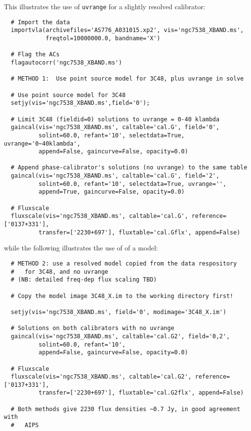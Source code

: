 This illustrates the use of {\tt uvrange} for a slightly resolved 
calibrator:
\small
\begin{verbatim}
  # Import the data
  importvla(archivefiles='AS776_A031015.xp2', vis='ngc7538_XBAND.ms',
            freqtol=10000000.0, bandname='X')

  # Flag the ACs
  flagautocorr('ngc7538_XBAND.ms')

  # METHOD 1:  Use point source model for 3C48, plus uvrange in solve

  # Use point source model for 3C48
  setjy(vis='ngc7538_XBAND.ms',field='0');

  # Limit 3C48 (fieldid=0) solutions to uvrange = 0-40 klambda
  gaincal(vis='ngc7538_XBAND.ms', caltable='cal.G', field='0',
          solint=60.0, refant='10', selectdata=True, uvrange='0~40klambda', 
          append=False, gaincurve=False, opacity=0.0)

  # Append phase-calibrator's solutions (no uvrange) to the same table
  gaincal(vis='ngc7538_XBAND.ms', caltable='cal.G', field='2', 
          solint=60.0, refant='10', selectdata=True, uvrange='', 
          append=True, gaincurve=False, opacity=0.0)

  # Fluxscale
  fluxscale(vis='ngc7538_XBAND.ms', caltable='cal.G', reference=['0137+331'],
          transfer=['2230+697'], fluxtable='cal.Gflx', append=False)
\end{verbatim}
\normalsize
while the following illustrates the use of of a model:
\small
\begin{verbatim}
  # METHOD 2: use a resolved model copied from the data respository
  #   for 3C48, and no uvrange
  # (NB: detailed freq-dep flux scaling TBD)

  # Copy the model image 3C48_X.im to the working directory first!

  setjy(vis='ngc7538_XBAND.ms', field='0', modimage='3C48_X.im')

  # Solutions on both calibrators with no uvrange
  gaincal(vis='ngc7538_XBAND.ms', caltable='cal.G2', field='0,2',
          solint=60.0, refant='10', 
          append=False, gaincurve=False, opacity=0.0)

  # Fluxscale
  fluxscale(vis='ngc7538_XBAND.ms', caltable='cal.G2', reference=['0137+331'],
          transfer=['2230+697'], fluxtable='cal.G2flx', append=False)

  # Both methods give 2230 flux densities ~0.7 Jy, in good agreement with
  #   AIPS
\end{verbatim}
\normalsize



